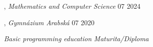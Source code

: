
, \textit{Mathematics and Computer Science}	\hfill 07 2024

, \textit{Gymnázium Arabská} \hfill	07 2020

\textit{
Basic programming education
Maturita/Diploma\\}